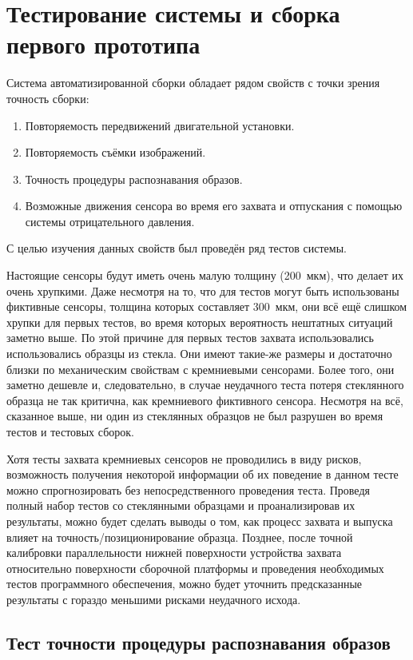 \chapter{Тестирование системы и сборка первого прототипа}

Система автоматизированной сборки обладает рядом свойств с точки зрения точность сборки:
\begin{enumerate}
\setlength\itemsep{-0.5em}
\item Повторяемость передвижений двигательной установки.
\item Повторяемость съёмки изображений.
\item Точность процедуры распознавания образов.
\item Возможные движения сенсора во время его захвата и отпускания с помощью системы отрицательного давления.
\end{enumerate}

С целью изучения данных свойств был проведён ряд тестов системы.

Настоящие сенсоры будут иметь очень малую толщину (200~мкм), что делает их очень хрупкими. Даже несмотря на то, что для тестов могут быть использованы фиктивные сенсоры, толщина которых составляет 300~мкм, они всё ещё слишком хрупки для первых тестов, во время которых вероятность нештатных ситуаций заметно выше. По этой причине для первых тестов захвата использовались использовались образцы из стекла. Они имеют такие-же размеры и достаточно близки по механическим свойствам с кремниевыми сенсорами. Более того, они заметно дешевле и, следовательно, в случае неудачного теста потеря стеклянного образца не так критична, как кремниевого фиктивного сенсора. Несмотря на всё, сказанное выше, ни один из стеклянных образцов не был разрушен во время тестов и тестовых сборок.

Хотя тесты захвата кремниевых сенсоров не проводились в виду рисков, возможность получения некоторой информации об их поведение в данном тесте можно спрогнозировать без непосредственного проведения теста. Проведя полный набор тестов со стеклянными образцами и проанализировав их результаты, можно будет сделать выводы о том, как процесс захвата и выпуска влияет на точность/позиционирование образца. Позднее, после точной калибровки параллельности нижней поверхности устройства захвата относительно поверхности сборочной платформы и проведения необходимых тестов программного обеспечения, можно будет уточнить предсказанные результаты с гораздо меньшими рисками неудачного исхода.

\section{Тест точности процедуры распознавания образов}

